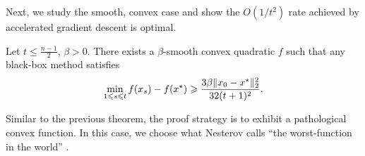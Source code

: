 Next, we study the smooth, convex case and show the $O(1/t^2)$ rate achieved by
accelerated gradient descent is optimal.

\begin{theorem}[Smooth-$f$]
Let $t \leq \frac{n-1}{2}$, $\beta > 0$. There exists a $\beta$-smooth convex
quadratic $f$ such that any black-box method satisfies
\begin{align}
    \min_{1 \leqslant s \leqslant t} f(x_s) - f(x^\star)
    \geqslant \frac{3\beta \lVert x_0 - x^\star\rVert_2^2}{32(t+1)^2}.
\end{align}
\end{theorem}
Similar to the previous theorem, the proof strategy is to exhibit 
a pathological convex function. In this case, we choose what Nesterov calls
``the worst-function in the world'' \cite{nesterov04}.

